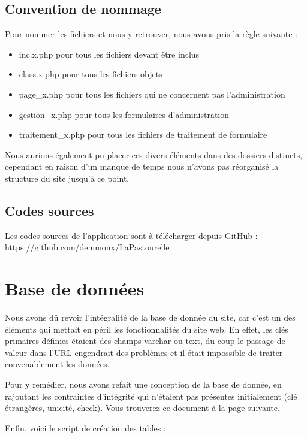 \documentclass[11pt]{report}
\begin{document}
 \subsection{Convention de nommage}
 Pour nommer les fichiers et nous y retrouver, nous avons pris la règle suivante
 : 
 \begin{itemize}
   \item inc.x.php pour tous les fichiers devant être inclus
   \item class.x.php pour tous les fichiers objets
   \item page\_x.php pour tous les fichiers qui ne concernent pas
   l’administration
   \item gestion\_x.php pour tous les formulaires d'administration
   \item traitement\_x.php pour tous les fichiers de traitement de formulaire \\
 \end{itemize}
 
 \par Nous aurions également pu placer ces divers éléments dans des dossiers
 distincts, cependant en raison d'un manque de temps nous n'avons pas réorganisé
 la structure du site jusqu'à ce point.
 
 \subsection{Codes sources}
 Les codes sources de l'application sont à télécharger depuis GitHub :
 https://github.com/demmonx/LaPastourelle

\section{Base de données}
Nous avons dû revoir l'intégralité de la base de donnée du site, car c'est un
des éléments qui mettait en péril les fonctionnalités du site web. En effet, les
clés primaires définies étaient des champs varchar ou text, du coup le passage 
de valeur dans l'URL engendrait des problèmes et il était impossible de traiter
convenablement les données. \\

\par Pour y remédier, nous avons refait une conception de la base de donnée, en
rajoutant les contraintes d'intégrité qui n'étaient pas présentes initialement
(clé étrangères, unicité, check). Vous trouverez ce document à la page suivante.


 
 
 \begin{multicols}{2}
 
 \par Enfin, voici le script de création des tables :\\

        \end{multicols}
        
\end{document}
